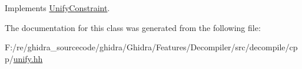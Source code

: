 Implements \mbox{\hyperlink{class_unify_constraint_ad9ab4ad91037f96bf803735d414d212d}{Unify\+Constraint}}.



The documentation for this class was generated from the following file\+:\begin{DoxyCompactItemize}
\item 
F\+:/re/ghidra\+\_\+sourcecode/ghidra/\+Ghidra/\+Features/\+Decompiler/src/decompile/cpp/\mbox{\hyperlink{unify_8hh}{unify.\+hh}}\end{DoxyCompactItemize}
